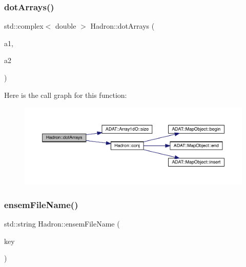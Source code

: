 \subsubsection{\texorpdfstring{dotArrays()}{dotArrays()}}
{\footnotesize\ttfamily std\+::complex$<$ double $>$ Hadron\+::dot\+Arrays (\begin{DoxyParamCaption}\item[{const \mbox{\hyperlink{classADAT_1_1Array1dO}{A\+D\+A\+T\+::\+Array1dO}}$<$ \mbox{\hyperlink{namespaceHadron_abaab2f90393b8dd8d93060e6ce6568e7}{cdouble}} $>$ \&}]{a1,  }\item[{const \mbox{\hyperlink{classADAT_1_1Array1dO}{A\+D\+A\+T\+::\+Array1dO}}$<$ \mbox{\hyperlink{namespaceHadron_abaab2f90393b8dd8d93060e6ce6568e7}{cdouble}} $>$ \&}]{a2 }\end{DoxyParamCaption})}

Here is the call graph for this function\+:\nopagebreak
\begin{figure}[H]
\begin{center}
\leavevmode
\includegraphics[width=350pt]{d1/daf/namespaceHadron_aad081d14cd95160e164751fe86cff3af_cgraph}
\end{center}
\end{figure}
\mbox{\label{namespaceHadron_ae52edd7538c484e9f1c59f65a1d010ca}} 
\subsubsection{\texorpdfstring{ensemFileName()}{ensemFileName()}\hspace{0.1cm}{\footnotesize\ttfamily [1/12]}}
{\footnotesize\ttfamily std\+::string Hadron\+::ensem\+File\+Name (\begin{DoxyParamCaption}\item[{const \mbox{\hyperlink{structFF_1_1DiscoKeyOperator__t}{F\+F\+::\+Disco\+Key\+Operator\+\_\+t}} \&}]{key }\end{DoxyParamCaption})}



